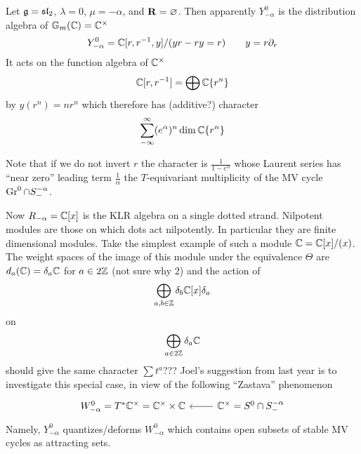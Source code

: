 % 
\begin{example}
    Let $\mathfrak g =\mathfrak{sl}_2$, $\lambda = 0$, $\mu = -\alpha$, and ${\bf R} = \varnothing$. Then apparently $Y^0_{-\alpha}$ is the distribution algebra of $\mathbb{G}_m(\mathbb C) = \mathbb C^\times$
    $$Y^0_{-\alpha} = \mathbb C[r,r^{-1},y]/(yr - ry = r) \qquad y = r\partial_r$$
    It acts on the function algebra of $\mathbb C^\times$ 
    $$\mathbb C[r,r^{-1}] = \bigoplus \mathbb C\{r^n\}$$ 
    by $y(r^n) = n r^n$ which therefore has (additive?) character 
    $$\sum_{-\infty}^\infty (e^\alpha)^n\dim \mathbb C\{r^n\}$$
    
    Note that if we do not invert $r$ the character is $\frac 1 {1-e^\alpha}$ whose Laurent series has ``near zero'' leading term $\frac 1 \alpha$ the $T$-equivariant multiplicity of the MV cycle $\operatorname{Gr}^0\cap S^{-\alpha}_-$.
    
    Now $R_{-\alpha} = \mathbb C[x]$ is the KLR algebra on a single dotted strand. Nilpotent modules are those on which dots act nilpotently. In particular they are finite dimensional modules. Take the simplest example of such a module $\mathbb C = \mathbb C[x]/(x)$. The weight spaces of the image of this module under the \cite{kam19} equivalence $\Theta$ are $d_a(\mathbb C) = \delta_a \mathbb C$ for $a\in 2\mathbb Z$ (not sure why 2) and the action of 
    $$
    \bigoplus_{a,b\in\mathbb Z}\delta_b\mathbb C[x]\delta_a
    $$
    on $$ \bigoplus_{a\in 2\mathbb Z}\delta_a\mathbb C $$
    should give the same character $\sum t^a$???
    Joel's suggestion from last year is to investigate this special case, in view of the following ``Zastava'' phenomenon
    $$
    \begin{tikzcd}
        W^0_{-\alpha} = T^\ast \CC^\times = \CC^\times \times\CC & \CC^\times = S^0 \cap S^{-\alpha}_- \ar[l] 
    \end{tikzcd}
    $$
    Namely, $Y^0_{-\alpha}$ quantizes/deforms $W^0_{-\alpha}$ which contains open subsets of stable MV cycles as attracting sets. 
\end{example}
